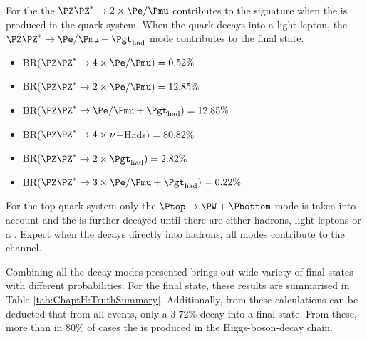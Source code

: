 For the \ZZ the $\ZZ \rightarrow 2 \times \emu$ contributes 
to the \dileptau signature when the \tauhad is produced in the
\Ptop quark system. When the \Ptop quark decays into a 
light lepton, the $\ZZ \rightarrow \emu + \tauhad$ mode contributes
to the \dileptau final state.
\begin{itemize}
	\item  BR($\ZZ \rightarrow 4 \times \emu)= 0.52\%$ 
	\item  BR($\ZZ \rightarrow 2 \times \emu)= 12.85\%$
	\item  BR($\ZZ \rightarrow \emu +\tauhad)= 12.85\%$
	\item  BR($\ZZ \rightarrow 4 \times \nu$+Hads$)= 80.82\%$
	\item  BR($\ZZ \rightarrow 2 \times \tauhad)= 2.82\%$	
	\item  BR($\ZZ \rightarrow 3 \times \emu + \tauhad)= 0.22\%$
\end{itemize}


For the top-quark system only the $\Ptop \rightarrow \PW + \Pbottom$
mode is taken into account and the \PW is further decayed until there are
either hadrons, light leptons or a \tauhad. Expect when the \PW decays directly
into hadrons, all modes contribute to the \dileptau channel.


Combining all the decay modes presented brings out wide variety of final states 
with different probabilities. For the \dileptau final state, these results are summarised in
Table \ref{tab:ChaptH:TruthSummary}.%
Additionally, from these calculations can be deducted that from all \tHq events, only
a $3.72\%$ decay into a \dileptau final state. %
From these, more than in 80\% of cases the \tauhad is produced in
the Higgs-boson-decay chain.

